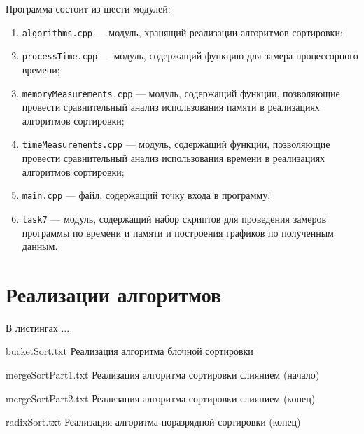 Программа состоит из шести модулей: 

\begin{enumerate}[label={\arabic*)}]
	\item \texttt{algorithms.cpp} --- модуль, хранящий реализации алгоритмов сортировки;
	\item \texttt{processTime.cpp} --- модуль, содержащий функцию для замера процессорного времени;
	\item \texttt{memoryMeasurements.cpp} --- модуль, содержащий функции, позволяющие провести сравнительный анализ использования памяти в реализациях алгоритмов сортировки;
	\item \texttt{timeMeasurements.cpp} --- модуль, содержащий функции, позволяющие провести сравнительный анализ использования времени в реализациях алгоритмов сортировки;
	\item \texttt{main.cpp} --- файл, содержащий точку входа в программу;
	\item \texttt{task7} --- модуль, содержащий набор скриптов для проведения замеров программы по времени и памяти и построения графиков по полученным данным.
\end{enumerate}

\clearpage

\section{Реализации алгоритмов}

В листингах ...

{bucketSort.txt} %
{Реализация алгоритма блочной сортировки} %

\clearpage

{mergeSortPart1.txt} %
{Реализация алгоритма сортировки слиянием (начало)} %

\clearpage

{mergeSortPart2.txt} %
{Реализация алгоритма сортировки слиянием (конец)} %

\clearpage

{radixSort.txt} %
{Реализация алгоритма поразрядной сортировки (конец)} %

